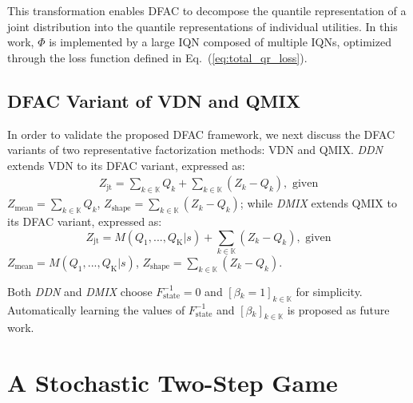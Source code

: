 \documentclass{article}
\newcommand{\state}{s}
\newcommand{\agentspace}{\mathbb{K}}
\newcommand{\agentcounter}{k}
\newcommand{\numberofagents}{\mathrm{K}}
\newcommand{\utilityexp}{Q}
\newcommand{\utility}{Z}
\newcommand{\joint}{\mathrm{jt}}
\newcommand{\quantilefunction}{F^{-1}}
\newcommand{\modelparameter}{\beta}
\newcommand{\monotonicfunction}{M}
\newcommand{\shapedecompositionfunction}{\Phi}
\newcommand{\ddn}{\textit{DDN}}
\newcommand{\dmix}{\textit{DMIX}}
\begin{document}
This transformation enables DFAC to decompose the quantile representation of a joint distribution into the quantile representations of individual utilities. In this work, $\shapedecompositionfunction{}$ is implemented by a large IQN composed of multiple IQNs, optimized through the loss function defined in Eq.~(\ref{eq:total_qr_loss}).

\subsection{DFAC Variant of VDN and QMIX}
\label{subsec:methodology_distributional_variant_of_vdn_and_qmix}

In order to validate the proposed DFAC framework, we next discuss the DFAC variants of two representative factorization methods: VDN and QMIX. \ddn{} extends VDN to its DFAC variant, expressed as:
\begin{equation}
\begin{split}
\utility_\joint=\sum_{\agentcounter\in\agentspace{}}\utilityexp_{\agentcounter}+\sum_{\agentcounter\in\agentspace{}}(\utility_{\agentcounter}-\utilityexp_{\agentcounter}), \text{ given}
\end{split}
\end{equation}
$\utility_{\mathrm{mean}}=\sum_{\agentcounter\in\agentspace{}}\utilityexp_{\agentcounter}$, $\utility_{\mathrm{shape}}=\sum_{\agentcounter\in\agentspace{}}(\utility_{\agentcounter}-\utilityexp_{\agentcounter})$; while \dmix{} extends QMIX to its DFAC variant, expressed as:
\begin{equation}
\utility_\joint=\monotonicfunction{}(\utilityexp_1,...,\utilityexp_\numberofagents\vert\state)+\sum_{\agentcounter\in\agentspace{}}(\utility_{\agentcounter}-\utilityexp_{\agentcounter}), \text{ given}
\end{equation}
$\utility_{\mathrm{mean}}=\monotonicfunction{}(\utilityexp_1,...,\utilityexp_\numberofagents\vert\state)$, $\utility_{\mathrm{shape}}=\sum_{\agentcounter\in\agentspace{}}(\utility_{\agentcounter}-\utilityexp_{\agentcounter})$.

Both \ddn{} and \dmix{} choose $\quantilefunction_{\text{state}}=0$ and $[\modelparameter{}_{\agentcounter}=1]_{\agentcounter{}\in\agentspace{}}$ for simplicity. Automatically learning the values of $\quantilefunction_{\text{state}}$ and $[\modelparameter{}_{\agentcounter}]_{\agentcounter{}\in\agentspace{}}$ is proposed as future work. \section{A Stochastic Two-Step Game}
\label{sec:distributional_2_step_game}
\end{document}

